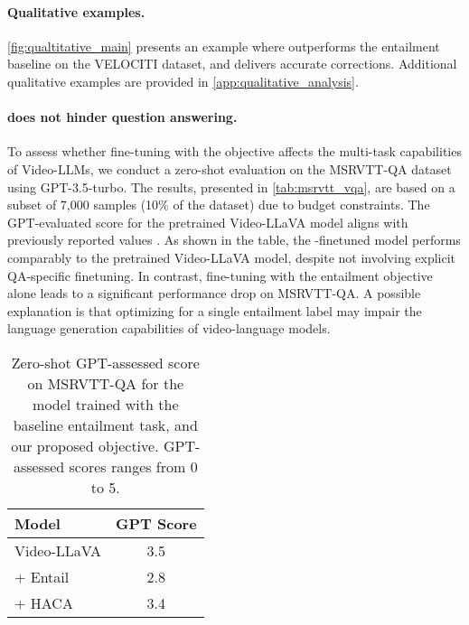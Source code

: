 \paragraph{Qualitative examples.}

\autoref{fig:qualtitative_main} presents an example where \method{} outperforms the entailment baseline on the VELOCITI dataset, and delivers accurate corrections. Additional qualitative examples are provided in \autoref{app:qualitative_analysis}.


\paragraph{\method{} does not hinder question answering.}
To assess whether fine-tuning with the \method{} objective affects the multi-task capabilities of Video-LLMs, we conduct a zero-shot evaluation on the MSRVTT-QA dataset \cite{xu2016msr} using GPT-3.5-turbo. The results, presented in \autoref{tab:msrvtt_vqa}, are based on a subset of 7,000 samples (10\% of the dataset) due to budget constraints. The GPT-evaluated score for the pretrained Video-LLaVA model aligns with previously reported values \cite{lin2023video}.
As shown in the table, the \method{}-finetuned model performs comparably to the pretrained Video-LLaVA model, despite not involving explicit QA-specific finetuning. In contrast, fine-tuning with the entailment objective alone leads to a significant performance drop on MSRVTT-QA. A possible explanation is that optimizing for a single entailment label may impair the language generation capabilities of video-language models.


\begin{table}[h]
    \centering
    \small
    \begin{tabular}{lc}
        \toprule
        \textbf{Model}       & \textbf{GPT Score} \\
        \midrule
        Video-LLaVA & 3.5 \\
        + Entail     & 2.8 \\
        + HACA       & 3.4 \\
        \bottomrule
    \end{tabular}
    \caption{Zero-shot GPT-assessed score on MSRVTT-QA for the model trained with the baseline entailment task, and our proposed \method{} objective. GPT-assessed scores ranges from 0 to 5.}
    \label{tab:msrvtt_vqa}
\end{table}
